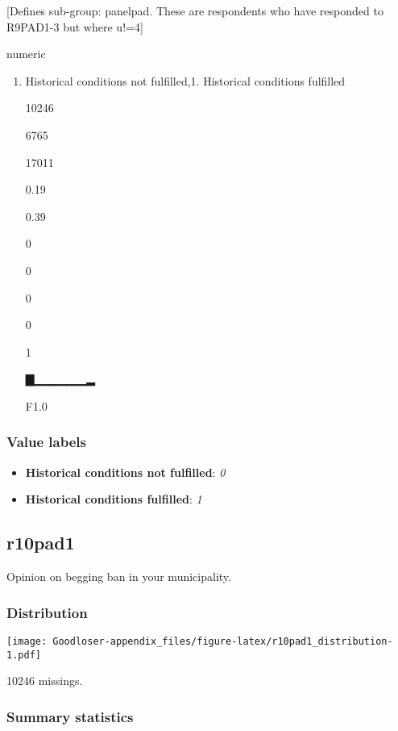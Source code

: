 \documentclass[]{book}
\providecommand{\tightlist}{%
  \setlength{\itemsep}{0pt}\setlength{\parskip}{0pt}}
\begin{document}
{[}Defines sub-group: panelpad. These are respondents who have responded
to R9PAD1-3 but where u!=4{]}

numeric

\begin{enumerate}
\def\labelenumi{\arabic{enumi}.}
\setcounter{enumi}{-1}
\tightlist
\item
  Historical conditions not fulfilled,1. Historical conditions fulfilled

  10246

  6765

  17011

  0.19

  0.39

  0

  0

  0

  0

  1

  ▇▁▁▁▁▁▁▂

  F1.0
\end{enumerate}

\subsubsection{Value labels}\label{r10panelpad_labels}

\begin{itemize}
\tightlist
\item
  \textbf{Historical conditions not fulfilled}: \emph{0}
\item
  \textbf{Historical conditions fulfilled}: \emph{1}
\end{itemize}

\subsection{r10pad1}\label{r10pad1}

Opinion on begging ban in your municipality.

\subsubsection{Distribution}\label{r10pad1_distribution}

\texttt{[image: Goodloser-appendix\_files/figure-latex/r10pad1\_distribution-1.pdf]}

10246 missings.

\subsubsection{Summary statistics}\label{r10pad1_summary}
\end{document}
